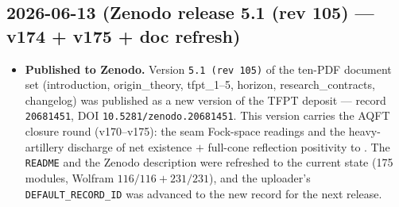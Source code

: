 \subsection*{2026-06-13 (Zenodo release 5.1 (rev 105) --- v174 + v175 + doc refresh)}
\begin{itemize}
\item \textbf{Published to Zenodo.} Version \texttt{5.1 (rev 105)} of the ten-PDF document set
  (introduction, origin\_theory, tfpt\_1--5, horizon, research\_contracts, changelog) was
  published as a new version of the TFPT deposit --- record \texttt{20681451},
  DOI \texttt{10.5281/zenodo.20681451}. This version carries the AQFT closure round (v170--v175):
  the seam Fock-space readings and the heavy-artillery discharge of net existence $+$ full-cone
  reflection positivity to \mE. The \texttt{README} and the Zenodo description were refreshed to the
  current state (175 modules, Wolfram $116/116 + 231/231$), and the uploader's
  \texttt{DEFAULT\_RECORD\_ID} was advanced to the new record for the next release.
\end{itemize}

